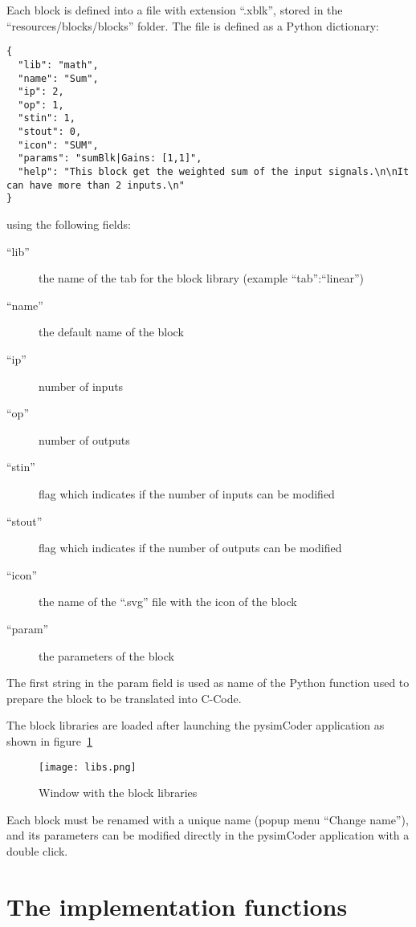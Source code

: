 Each block is defined into a file with extension ``.xblk'', stored in the ``resources/blocks/blocks'' folder.
The file is defined as a Python dictionary:

\scriptsize
\begin{verbatim}
{
  "lib": "math",
  "name": "Sum",
  "ip": 2,
  "op": 1,
  "stin": 1,
  "stout": 0,
  "icon": "SUM",
  "params": "sumBlk|Gains: [1,1]",
  "help": "This block get the weighted sum of the input signals.\n\nIt can have more than 2 inputs.\n"
}
\end{verbatim}
\normalsize

using the following fields:

\begin{description}
\item[``lib''] the name of the tab for the block library (example 
``tab'':``linear'')
\item [``name''] the default name of the block
\item [``ip''] number of inputs
\item [``op''] number of outputs
\item [``stin''] flag which indicates if the number of inputs can be modified
\item [``stout''] flag which indicates if the number of outputs can be modified
\item [``icon'']the name of the ``.svg'' file with the icon of the block
\item [``param''] the parameters of the block
\end{description}

The first string in the param field is used as name of the Python function used 
to prepare the block to be translated into C-Code.

The block libraries are loaded after launching the pysimCoder application as shown 
in figure~\ref{Fig:app1}

 \begin{figure}[htbp]	%
 \centering
 \texttt{[image: libs.png]}
 \caption{Window with the block libraries}
 \label{Fig:app1}
 \end{figure}

Each block must be renamed with a unique name (popup menu ``Change name''), and 
its parameters can be modified directly in the pysimCoder application with a double 
click.

\section{The implementation functions}

